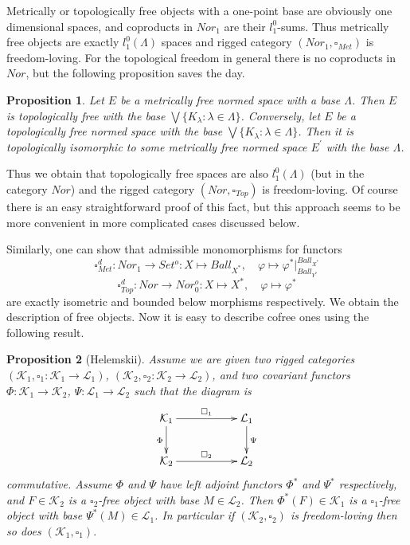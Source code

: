 \documentclass[a0b,landscape]{a0poster}
\newtheorem*{proposition}{Proposition}
\begin{document}
\begin{multicols}{4}
Metrically or topologically free objects with a one-point base are obviously one dimensional spaces, and coproducts in $Nor_1$ are their $l_1^0$-sums.
Thus metrically free objects are exactly $l_1^0(\Lambda)$ spaces and rigged category $(Nor_1, \square_{Met})$ is freedom-loving. For the topological freedom in general there 
is no coproducts in $Nor$, but the following proposition saves the day.

\begin{proposition} Let $E$ be a metrically free normed space with a base $\Lambda$. Then $E$ is topologically free with the base $\bigvee\{K_{\lambda} : \lambda \in\Lambda\}$. Conversely, 
let $E$ be a topologically free normed space with the base $\bigvee\{K_{\lambda}: \lambda \in\Lambda\}$. Then it is topologically isomorphic to some metrically free normed space $E^{'}$ 
with the base $\Lambda$.
\end{proposition}

Thus we obtain that topologically free spaces are also $l_1^0(\Lambda)$ (but in the category $Nor$) and the rigged category $(Nor, \square_{Top})$ is freedom-loving. Of course 
there is an easy straightforward proof of this fact, but this approach seems to be more convenient in more complicated cases discussed below.

Similarly, one can show that admissible monomorphisms for functors
$$
\square_{Met}^d:Nor_1\to Set^o: X\mapsto Ball_{X^*},\quad\varphi\mapsto \varphi^*|_{Ball_{Y^*}}^{Ball_{X^*}}
$$
$$
\square_{Top}^d:Nor\to Nor_0^o: X\mapsto X^*,\quad\varphi\mapsto \varphi^*
$$
are exactly isometric and bounded below morphisms respectively. We obtain the description of free objects. Now it is easy to describe cofree ones using the following result.

\begin{proposition}[Helemskii] Assume we are given two rigged categories $(\mathcal{K}_1, \square_1: \mathcal{K}_1 \to \mathcal{L}_1)$,
$(\mathcal{K}_2, \square_2 : \mathcal{K}_2 \to \mathcal{L}_2)$, and two covariant functors $\Phi : \mathcal{K}_1 \to \mathcal{K}_2$,
$\Psi : \mathcal{L}_1 \to \mathcal{L}_2$ such that the diagram is
$$
\xymatrix{
{\mathcal{K}_1}\ar[d]_{\Phi}
\ar[rr]^{\square_1} && {\mathcal{L}_1}\ar[d]^{\Psi}\\
{\mathcal{K}_2}\ar[rr]^{\square_2} &&{\mathcal{L}_2}}
$$
commutative. Assume $\Phi$ and $\Psi$ have left adjoint functors $\Phi^*$ and $\Psi^*$ respectively, and
$F\in\mathcal{K}_2$ is a $\square_2$-free object with base $M\in\mathcal{L}_2$. Then $\Phi^*(F)\in\mathcal{K}_1$
is a $\square_1$-free object with base $\Psi^*(M)\in\mathcal{L}_1$. In particular if
$(\mathcal{K}_2,\square_2)$ is freedom-loving then so does $(\mathcal{K}_1,\square_1).$
\end{proposition}


\end{multicols}
\end{document}
